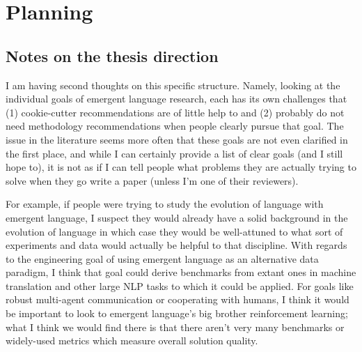 \chapter{Planning}


\section{Notes on the thesis direction}
I am having second thoughts on this  specific structure.
Namely, looking at the individual goals of emergent language research, each has its own challenges that (1) cookie-cutter recommendations are of little help to and (2) probably do not need methodology recommendations when people clearly pursue that goal.
The issue in the literature seems more often that these goals are not even clarified in the first place, and while I can certainly provide a list of clear goals (and I still hope to), it is not as if I can tell people what problems they are actually trying to solve when they go write a paper (unless I'm one of their reviewers). 

For example, if people were trying to study the evolution of language with emergent language, I suspect they would already have a solid background in the evolution of language in which case they would be well-attuned to what sort of experiments and data would actually be helpful to that discipline.
With regards to the engineering goal of using emergent language as an alternative data paradigm, I think that goal could derive benchmarks from extant ones in machine translation and other large NLP tasks to which it could be applied.
For goals like robust multi-agent communication or cooperating with humans, I think it would be important to look to emergent language's big brother reinforcement learning; what I think we would find there is that there aren't very many benchmarks or widely-used metrics which measure overall solution quality. 

